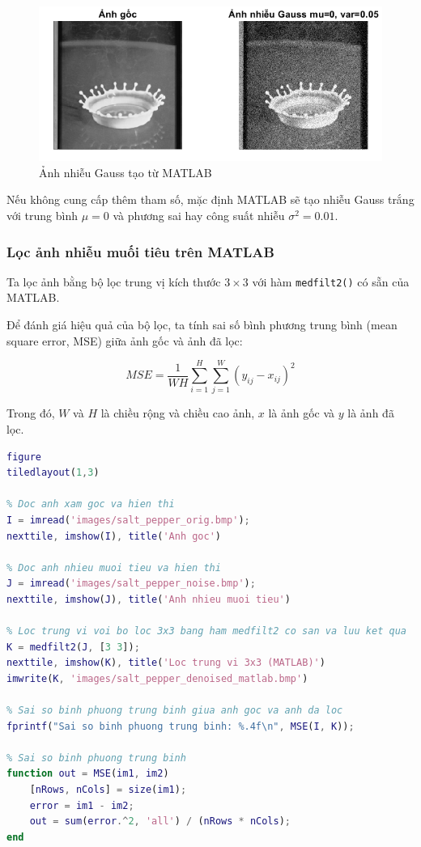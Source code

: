 \begin{figure}[H]
    \centering
    \includegraphics[width=.9\linewidth]{images/gaussian_noise_matlab.png}
    \caption{Ảnh nhiễu Gauss tạo từ MATLAB}
    \label{fig:gaussian_noise_matlab}
\end{figure}

Nếu không cung cấp thêm tham số, mặc định MATLAB sẽ tạo nhiễu Gauss trắng với trung bình $\mu = 0$ và phương sai hay công suất nhiễu $\sigma^2 = 0.01$.

\subsubsection{Lọc ảnh nhiễu muối tiêu trên MATLAB}

Ta lọc ảnh bằng bộ lọc trung vị kích thước $3 \times 3$ với hàm \texttt{medfilt2()} có sẵn của MATLAB. 

Để đánh giá hiệu quả của bộ lọc, ta tính sai số bình phương trung bình (mean square error, MSE) giữa ảnh gốc và ảnh đã lọc:

\begin{equation}\label{eqn:MSE}
    MSE = \frac{1}{WH} \sum_{i=1}^{H} \sum_{j=1}^{W} {(y_{ij} - x_{ij})^2}
\end{equation}

Trong đó, $W$ và $H$ là chiều rộng và chiều cao ảnh, $x$ là ảnh gốc và $y$ là ảnh đã lọc.

\begin{lstlisting}[language=MATLAB]
figure
tiledlayout(1,3)

% Doc anh xam goc va hien thi
I = imread('images/salt_pepper_orig.bmp');
nexttile, imshow(I), title('Anh goc')

% Doc anh nhieu muoi tieu va hien thi
J = imread('images/salt_pepper_noise.bmp');
nexttile, imshow(J), title('Anh nhieu muoi tieu')

% Loc trung vi voi bo loc 3x3 bang ham medfilt2 co san va luu ket qua
K = medfilt2(J, [3 3]);
nexttile, imshow(K), title('Loc trung vi 3x3 (MATLAB)')
imwrite(K, 'images/salt_pepper_denoised_matlab.bmp')

% Sai so binh phuong trung binh giua anh goc va anh da loc
fprintf("Sai so binh phuong trung binh: %.4f\n", MSE(I, K));

% Sai so binh phuong trung binh
function out = MSE(im1, im2)
    [nRows, nCols] = size(im1);
    error = im1 - im2;
    out = sum(error.^2, 'all') / (nRows * nCols);
end
\end{lstlisting}

